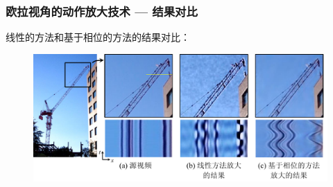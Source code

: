 \documentclass[xcolor=svgnames,serif,table,10pt]{beamer}
\begin{document}
\begin{frame}
  \frametitle{欧拉视角的动作放大技术 --- 结果对比}
  线性的方法和基于相位的方法的结果对比：

  \begin{figure}[htbp]
  \centering
  \includegraphics[width=\textwidth]{compare.pdf}
  \label{fig:compare}
\end{figure}
\end{frame}
\end{document}
